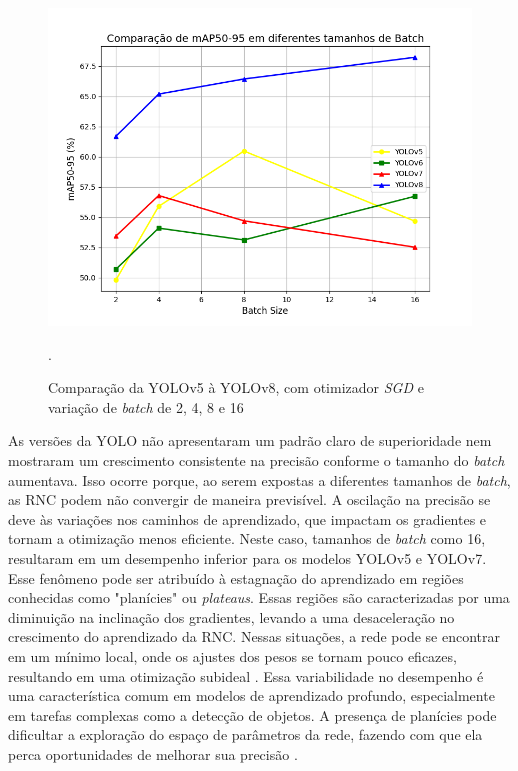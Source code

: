 \begin{figure}[!h]
    \centering
    \begin{minipage}{0.7\linewidth}
    \centering
    \captionsetup{justification=centering,margin=0.5cm,font=small}
    \includegraphics[width=1\linewidth]{img/cap6/comparacao-yolos-grafico.png}
    \caption{Comparação da YOLOv5 à YOLOv8, com otimizador \textit{SGD} e variação de \textit{batch} de 2, 4, 8 e 16}.
    \label{fig:compara-todas-yolo}
    \end{minipage}
\end{figure}

As versões da YOLO não apresentaram um padrão claro de superioridade nem mostraram um crescimento consistente na precisão conforme o tamanho do \textit{batch} aumentava. Isso ocorre porque, ao serem expostas a diferentes tamanhos de \textit{batch}, as RNC podem não convergir de maneira previsível. A oscilação na precisão se deve às variações nos caminhos de aprendizado, que impactam os gradientes e tornam a otimização menos eficiente. Neste caso, tamanhos de \textit{batch} como 16, resultaram em um desempenho inferior para os modelos YOLOv5 e YOLOv7. Esse fenômeno pode ser atribuído à estagnação do aprendizado em regiões conhecidas como "planícies" ou \textit{plateaus}. Essas regiões são caracterizadas por uma diminuição na inclinação dos gradientes, levando a uma desaceleração no crescimento do aprendizado da RNC. Nessas situações, a rede pode se encontrar em um mínimo local, onde os ajustes dos pesos se tornam pouco eficazes, resultando em uma otimização subideal \cite{theorangeduck_minima_saddle}. Essa variabilidade no desempenho é uma característica comum em modelos de aprendizado profundo, especialmente em tarefas complexas como a detecção de objetos. A presença de planícies pode dificultar a exploração do espaço de parâmetros da rede, fazendo com que ela perca oportunidades de melhorar sua precisão \cite{goodfellow2016deep}.

